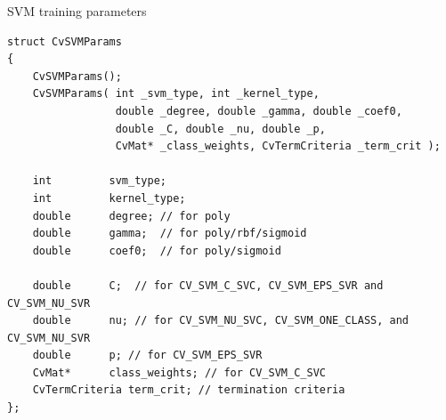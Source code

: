 
SVM training parameters

\begin{lstlisting}
struct CvSVMParams
{
    CvSVMParams();
    CvSVMParams( int _svm_type, int _kernel_type,
                 double _degree, double _gamma, double _coef0,
                 double _C, double _nu, double _p,
                 CvMat* _class_weights, CvTermCriteria _term_crit );

    int         svm_type;
    int         kernel_type;
    double      degree; // for poly
    double      gamma;  // for poly/rbf/sigmoid
    double      coef0;  // for poly/sigmoid

    double      C;  // for CV_SVM_C_SVC, CV_SVM_EPS_SVR and CV_SVM_NU_SVR
    double      nu; // for CV_SVM_NU_SVC, CV_SVM_ONE_CLASS, and CV_SVM_NU_SVR
    double      p; // for CV_SVM_EPS_SVR
    CvMat*      class_weights; // for CV_SVM_C_SVC
    CvTermCriteria term_crit; // termination criteria
};

\end{lstlisting}

